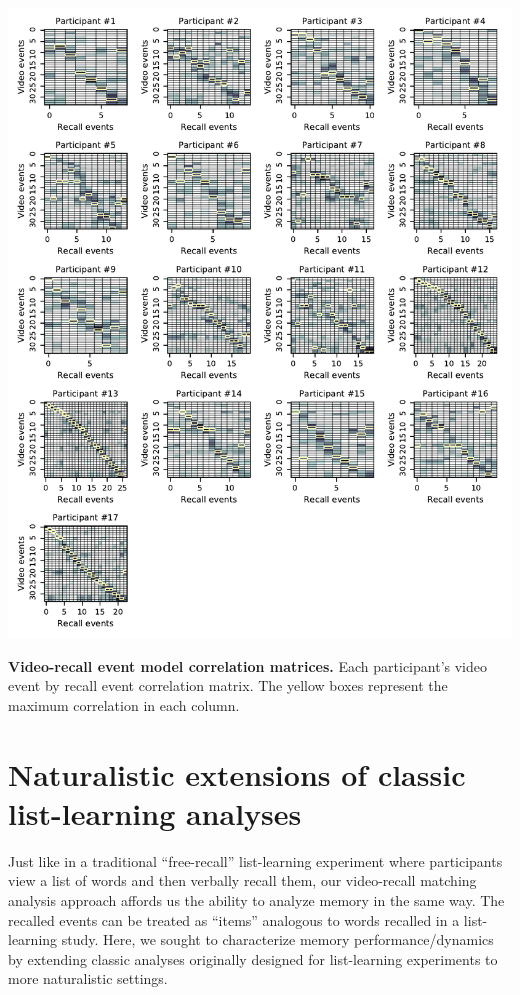 \documentclass{article}
\begin{document}
\begin{suppfigure}[t!]
\centering
\includegraphics[width=1\textwidth]{figs/supp2_matchmats.pdf}
\caption{\small \textbf{Video-recall event model correlation matrices.} Each participant's video event by recall event correlation matrix.  The yellow boxes represent the maximum correlation in each column.}
\label{fig:matchmats}
\end{suppfigure}

\section*{Naturalistic extensions of classic list-learning analyses}
Just like in a traditional ``free-recall'' list-learning experiment where participants view a list of words and then verbally recall them, our video-recall matching analysis approach affords us the ability to analyze memory in the same way. The recalled events can be treated as ``items'' analogous to words recalled in a list-learning study. Here, we sought to characterize memory performance/dynamics by extending classic analyses originally designed for list-learning experiments to more naturalistic settings.
\end{document}
